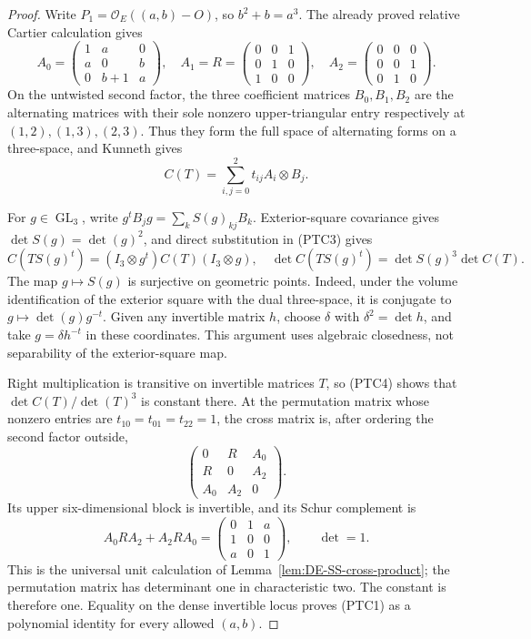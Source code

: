 \begin{proof}
Write \(P_1=\mathcal O_E((a,b)-O)\), so \(b^2+b=a^3\).
The already proved relative Cartier calculation gives
\[
 A_0=\begin{pmatrix}1&a&0\\a&0&b\\0&b+1&a\end{pmatrix},
 \quad A_1=R=\begin{pmatrix}0&0&1\\0&1&0\\1&0&0\end{pmatrix},
 \quad A_2=\begin{pmatrix}0&0&0\\0&0&1\\0&1&0\end{pmatrix}.
 \tag{PTC2}
\]
On the untwisted second factor, the three coefficient matrices
\(B_0,B_1,B_2\) are the alternating matrices with their sole
nonzero upper-triangular entry respectively at \((1,2),(1,3),(2,3)\).
Thus they form the full space of alternating forms on a three-space,
and Kunneth gives
\[
                    C(T)=\sum_{i,j=0}^2t_{ij}A_i\otimes B_j.
 \tag{PTC3}
\]

For \(g\in\operatorname{GL}_3\), write
\(g^tB_jg=\sum_k S(g)_{kj}B_k\). Exterior-square covariance
gives \(\det S(g)=\det(g)^2\), and direct substitution in
(PTC3) gives
\[
 C(TS(g)^t)=(I_3\otimes g^t)C(T)(I_3\otimes g),
 \quad
 \det C(TS(g)^t)=\det S(g)^3\det C(T).
 \tag{PTC4}
\]
The map \(g\mapsto S(g)\) is surjective on geometric points.
Indeed, under the volume identification of the exterior square
with the dual three-space, it is conjugate to
\(g\mapsto\det(g)g^{-t}\). Given any invertible matrix \(h\),
choose \(\delta\) with \(\delta^2=\det h\), and take
\(g=\delta h^{-t}\) in these coordinates. This argument uses
algebraic closedness, not separability of the exterior-square map.

Right multiplication is transitive on invertible matrices \(T\),
so (PTC4) shows that \(\det C(T)/\det(T)^3\) is constant
there. At the permutation matrix whose nonzero entries are
\(t_{10}=t_{01}=t_{22}=1\), the cross matrix is, after ordering
the second factor outside,
\[
 \begin{pmatrix}0&R&A_0\\R&0&A_2\\A_0&A_2&0\end{pmatrix}.
\]
Its upper six-dimensional block is invertible, and its Schur
complement is
\[
 A_0RA_2+A_2RA_0
 =\begin{pmatrix}0&1&a\\1&0&0\\a&0&1\end{pmatrix},
 \qquad\det=1.
\]
This is the universal unit calculation of
Lemma~\ref{lem:DE-SS-cross-product}; the permutation matrix has
determinant one in characteristic two. The constant is therefore
one. Equality on the dense invertible locus proves (PTC1) as a
polynomial identity for every allowed \((a,b)\).
\end{proof}

